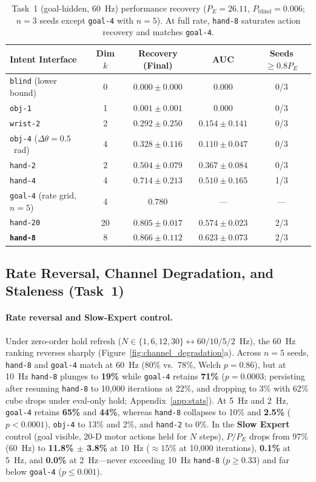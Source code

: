 \begin{table}[t]
  \centering
  \caption{Task~1 (goal-hidden, 60~Hz) performance recovery ($P_E=26.11$, $P_{\mathrm{blind}}=0.006$; $n=3$ seeds except \texttt{goal-4} with $n=5$). At full rate, \texttt{hand-8} saturates action recovery and matches \texttt{goal-4}.}
  \label{tab:m1_60hz}
  \small
  \begin{tabular}{lcccc}
    \toprule
    Intent Interface & Dim $k$ & Recovery (Final) & AUC & Seeds $\ge 0.8 P_E$ \\
    \midrule
    \texttt{blind} (lower bound) & 0 & $0.000 \pm 0.000$ & $0.000$ & 0/3 \\
    \texttt{obj-1} & 1 & $0.001 \pm 0.001$ & $0.000$ & 0/3 \\
    \texttt{wrist-2} & 2 & $0.292 \pm 0.250$ & $0.154 \pm 0.141$ & 0/3 \\
    \texttt{obj-4} ($\Delta\theta=0.5$~rad) & 4 & $0.328 \pm 0.116$ & $0.110 \pm 0.047$ & 0/3 \\
    \texttt{hand-2} & 2 & $0.504 \pm 0.079$ & $0.367 \pm 0.084$ & 0/3 \\
    \texttt{hand-4} & 4 & $0.714 \pm 0.213$ & $0.510 \pm 0.165$ & 1/3 \\
    \texttt{goal-4} (rate grid, $n=5$) & 4 & $0.780$ & --- & --- \\
    \texttt{hand-20} & 20 & $0.805 \pm 0.017$ & $0.574 \pm 0.023$ & 2/3 \\
    \textbf{\texttt{hand-8}} & 8 & $\mathbf{0.866 \pm 0.112}$ & $\mathbf{0.623 \pm 0.073}$ & 2/3 \\
    \bottomrule
  \end{tabular}
\end{table}

\subsection{Rate Reversal, Channel Degradation, and Staleness (Task~1)}
\label{sec:exp_rate}
\paragraph{Rate reversal and Slow-Expert control.}
Under zero-order hold refresh ($N \in \{1, 6, 12, 30\} \leftrightarrow 60/10/5/2$~Hz), the 60~Hz ranking reverses sharply (Figure~\ref{fig:channel_degradation}a).
Across $n=5$ seeds, \texttt{hand-8} and \texttt{goal-4} match at 60~Hz (80\% vs.\ 78\%, Welch $p=0.86$), but at 10~Hz \texttt{hand-8} plunges to \textbf{19\%} while \texttt{goal-4} retains \textbf{71\%} ($p=0.0003$; persisting after resuming \texttt{hand-8} to 10,000 iterations at 22\%, and dropping to 3\% with 62\% cube drops under eval-only hold; Appendix~\ref{app:stats}).
At 5~Hz and 2~Hz, \texttt{goal-4} retains \textbf{65\%} and \textbf{44\%}, whereas \texttt{hand-8} collapses to 10\% and \textbf{2.5\%} ($p<0.0001$), \texttt{obj-4} to 13\% and 2\%, and \texttt{hand-2} to 0\%.
In the \textbf{Slow Expert} control (goal visible, 20-D motor actions held for $N$ steps), $P/P_E$ drops from 97\% (60~Hz) to \textbf{11.8\% $\pm$ 3.8\%} at 10~Hz ($\approx 15\%$ at 10,000 iterations), \textbf{0.1\%} at 5~Hz, and \textbf{0.0\%} at 2~Hz—never exceeding 10~Hz \texttt{hand-8} ($p \ge 0.33$) and far below \texttt{goal-4} ($p \le 0.001$).

